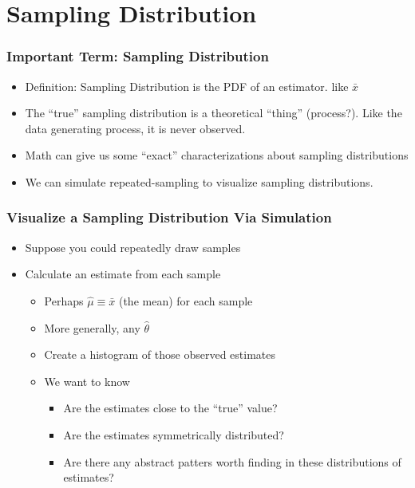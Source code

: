 \documentclass[10pt,english]{beamer}
\begin{document}
\section{Sampling Distribution}


\begin{frame}
  \frametitle{Important Term: Sampling Distribution}
  \begin{itemize}
  \item Definition: Sampling Distribution is the PDF of an estimator. like $\bar{x}$
  \item The ``true'' sampling distribution is a theoretical ``thing''
    (process?). Like the data generating process, it is never observed.
  \item Math can give us some ``exact'' characterizations about
    sampling distributions
  \item We can simulate repeated-sampling to visualize sampling distributions.
  \end{itemize}
\end{frame}


\begin{frame}
  \frametitle{Visualize a Sampling Distribution Via Simulation}
  \begin{itemize}
    \item Suppose you could repeatedly draw samples
    \item Calculate an estimate from each sample
      \begin{itemize}
        \item Perhaps $\hat{\mu} \equiv \bar{x}$ (the mean) for each sample
        \item More generally, any $\hat{\theta}$
   \item Create a histogram of those observed estimates
   \item We want to know
     \begin{itemize}
      \item Are the estimates close to the ``true'' value?
      \item Are the estimates symmetrically distributed?
      \item Are there any abstract patters worth finding in these
        distributions of estimates?
      \end{itemize}
    \end{itemize}
  \end{itemize}
\end{frame}
\end{document}
